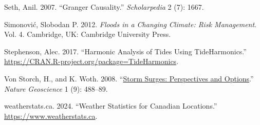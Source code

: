 \documentclass[
  letterpaper,
  DIV=11,
  numbers=noendperiod]{scrartcl}
\newlength{\cslhangindent}
\newenvironment{CSLReferences}[2] %
 {\begin{list}{}{%
  \setlength{\itemindent}{0pt}
  \setlength{\leftmargin}{0pt}
  \setlength{\parsep}{0pt}
  \ifodd #1
   \setlength{\leftmargin}{\cslhangindent}
   \setlength{\itemindent}{-1\cslhangindent}
  \fi
  \setlength{\itemsep}{#2\baselineskip}}}
 {\end{list}}
\begin{document}
\begin{CSLReferences}{1}{0}
Seth, Anil. 2007. {``Granger Causality.''} \emph{Scholarpedia} 2 (7):
1667.

Simonović, Slobodan P. 2012. \emph{Floods in a Changing Climate: Risk
Management}. Vol. 4. Cambridge, UK: Cambridge University Press.

Stephenson, Alec. 2017. {``{H}armonic {A}nalysis of {T}ides {U}sing
{T}ide{H}armonics.''}
\url{https://CRAN.R-project.org/package=TideHarmonics}.

Von Storch, H., and K. Woth. 2008. {``\href{}{Storm Surges: Perspectives
and Options}.''} \emph{Nature Geoscience} 1 (9): 488--89.

weatherstats.ca. 2024. {``Weather Statistics for Canadian Locations.''}
\url{https://www.weatherstats.ca}.

\end{CSLReferences}
\end{document}
